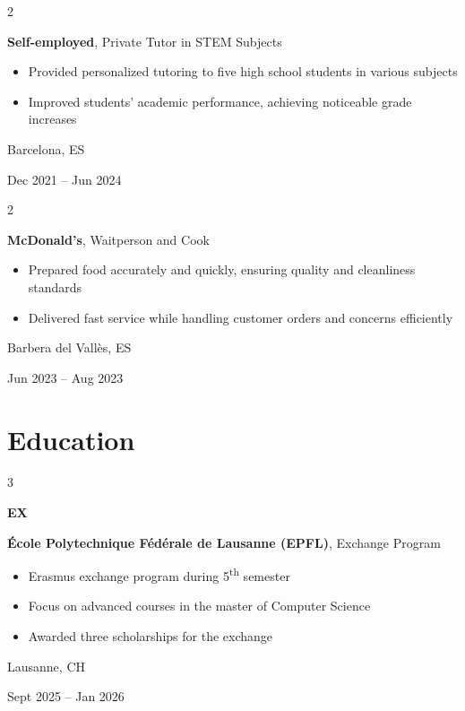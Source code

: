\documentclass[10pt, letterpaper]{article}
\newenvironment{highlights}{
    \begin{itemize}[
        topsep=0.10 cm,
        parsep=0.10 cm,
        partopsep=0pt,
        itemsep=0pt,
        leftmargin=0.4 cm + 10pt
    ]
}{
    \end{itemize}
} %
\newenvironment{twocolentry}[2][]{
    \onecolentry
    \def\secondColumn{#2}
    \setcolumnwidth{\fill, 4.5 cm}
    \begin{paracol}{2}
}{
    \switchcolumn \raggedleft \secondColumn
    \end{paracol}
    \endonecolentry
} %
\newenvironment{threecolentry}[3][]{
    \onecolentry
    \def\thirdColumn{#3}
    \setcolumnwidth{1 cm, \fill, 4.5 cm}
    \begin{paracol}{3}
    {\raggedright #2} \switchcolumn
}{
    \switchcolumn \raggedleft \thirdColumn
    \end{paracol}
    \endonecolentry
} %
\begin{document}
        \vspace{0.2 cm}

        \begin{twocolentry}{
            Barcelona, ES

            Dec 2021 – Jun 2024
        }
            \textbf{Self-employed}, Private Tutor in STEM Subjects
            \begin{highlights}
                \item Provided personalized tutoring to five high school students in various subjects
                \item Improved students' academic performance, achieving noticeable grade increases
            \end{highlights}
        \end{twocolentry}

        \vspace{0.2 cm}

        \begin{twocolentry}{
            Barbera del Vallès, ES
            
            Jun 2023 – Aug 2023
        }
            \textbf{McDonald's}, Waitperson and Cook
            \begin{highlights}
                \item Prepared food accurately and quickly, ensuring quality and cleanliness standards
                \item Delivered fast service while handling customer orders and concerns efficiently
            \end{highlights}
        \end{twocolentry}


    \section{Education}
        \begin{threecolentry}{\textbf{EX}}{
            Lausanne, CH
            
            Sept 2025 – Jan 2026
        }
            \textbf{École Polytechnique Fédérale de Lausanne (EPFL)}, Exchange Program
            \begin{highlights}
                \item Erasmus exchange program during 5\textsuperscript{th} semester
                \item Focus on advanced courses in the master of Computer Science
                \item Awarded three scholarships for the exchange
            \end{highlights}
        \end{threecolentry}
    
\end{document}
